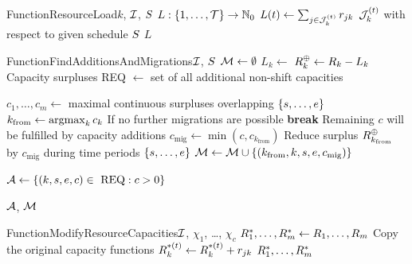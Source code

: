 \begin{alg}{Function}{ResourceLoad}{$k$, $\mathcal{I}$, $S$} \label{alg:resource-load}
\State $L : \{{1}, \dots, {\mathcal{T}}\} \to \mathbb{N}_0$
    \State $L(t) \gets \sum_{j \in \mathcal{J}_{k}^{(t)}} r_{j k}$
        \Comment $\mathcal{J}_{k}^{(t)}$ with respect to given schedule $S$
\EndFor
\State \Return $L$
\end{alg}


\begin{alg}{Function}{FindAdditionsAndMigrations}{$\mathcal{I}$, $S$} \label{alg:find-additions-and-migrations}
\State $\mathcal{M} \gets \emptyset$
 $L_k \gets$  \EndFor
{} $R_{k}^\oplus \gets R_{k} - L_k$ \Comment Capacity surpluses \EndFor
\State REQ $\gets$ set of all additional non-shift capacities

        \State $c_1, \dots, c_m \gets$ maximal continuous surpluses overlapping $\{{s}, \dots, {e}\}$
        \State $k_\text{from} \gets \operatorname*{\operatorname{argmax}}_k{c_k}$
         \Comment If no further migrations are possible
            \State \textbf{break} \Comment Remaining $c$ will be fulfilled by capacity additions
        \EndIf
        \State $c_\text{mig} \gets \min(c, c_{k_\text{from}})$
        \State Reduce surplus $R_{k_{\text{from}}}^\oplus$ by $c_{\text{mig}}$ during time periods $\{{s}, \dots, {e}\}$
        \State $\mathcal{M} \gets \mathcal{M} \cup \{ (k_\text{from}, k, s, e, c_{\text{mig}}) \}$
    \EndWhile
\EndFor

\State $\mathcal{A} \gets \left\{ (k, s, e, c) \in \text{ REQ} : c > 0 \right\}$

\State \Return $\mathcal{A}$, $\mathcal{M}$
\end{alg}


\begin{alg}{Function}{ModifyResourceCapacities}{$\mathcal{I}$, $\chi_1$, \dots, $\chi_c$} \label{alg:modify-resource-capacities}
\State $R_{1}^*, \dots, R_{m}^* \gets R_{1}, \dots, R_{m}$
    \Comment Copy the original capacity functions
            \State $\capacity{k}{t}^* \gets \capacity{k}{t}^* + \consumption{j}{k}$
        \EndFor
    \EndFor
\EndFor
\State \Return $R_{1}^*, \ldots, R_{m}^*$
\end{alg}


